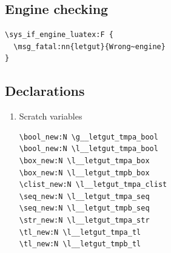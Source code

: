 \documentclass{letgut}
\begin{document}
\subsection{Engine checking}
\label{ImplementationEnginechecking-lz7g55h0jlj0}
\begin{lstlisting}
\sys_if_engine_luatex:F {
  \msg_fatal:nn{letgut}{Wrong~engine}
}
\end{lstlisting}
\subsection{Declarations}
\label{ImplementationDeclarations-3j8g55h0jlj0}
\begin{enumerate}
\item Scratch variables
\label{ImplementationDeclarationsScratchvariables-onuajq01p4k0}
\begin{lstlisting}
\bool_new:N \g__letgut_tmpa_bool
\bool_new:N \l__letgut_tmpa_bool
\box_new:N \l__letgut_tmpa_box
\box_new:N \l__letgut_tmpb_box
\clist_new:N \l__letgut_tmpa_clist
\seq_new:N \l__letgut_tmpa_seq
\seq_new:N \l__letgut_tmpb_seq
\str_new:N \l__letgut_tmpa_str
\tl_new:N \l__letgut_tmpa_tl
\tl_new:N \l__letgut_tmpb_tl
\end{lstlisting}
\end{enumerate}
\end{document}
